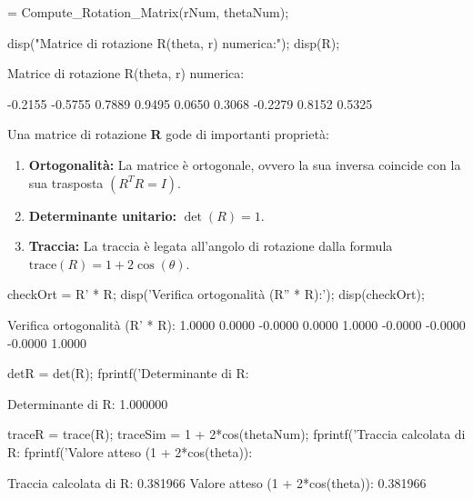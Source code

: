 \documentclass[11pt, a4paper]{article}
\begin{document}
\newpage
\begin{matlabcode}
[R] = Compute_Rotation_Matrix(rNum, thetaNum);

disp("Matrice di rotazione R(theta, r) numerica:");
disp(R);
\end{matlabcode}
\begin{matlaboutput}
Matrice di rotazione R(theta, r) numerica:
\end{matlaboutput}
\begin{matlaboutput}
   -0.2155   -0.5755    0.7889
    0.9495    0.0650    0.3068
   -0.2279    0.8152    0.5325
\end{matlaboutput}

\begin{par}
\begin{flushleft}
Una matrice di rotazione \textbf{R} gode di importanti proprietà:
\end{flushleft}
\end{par}

\begin{enumerate}
\setlength{\itemsep}{1ex}
   \item{\begin{flushleft} \textbf{Ortogonalità:} La matrice è ortogonale, ovvero la sua inversa coincide con la sua trasposta $(R^T R=I)$. \end{flushleft}}
   \item{\begin{flushleft} \textbf{Determinante unitario: }$\det (R)=1$. \end{flushleft}}
   \item{\begin{flushleft} \textbf{Traccia: }La traccia è legata all'angolo di rotazione dalla formula $\textrm{trace}(R)=1+2\cos (\theta )$. \end{flushleft}}
\end{enumerate}

\begin{matlabcode}
checkOrt = R' * R;
disp('Verifica ortogonalità (R'' * R):');
disp(checkOrt);
\end{matlabcode}
\begin{matlaboutput}
Verifica ortogonalità (R' * R):
    1.0000    0.0000   -0.0000
    0.0000    1.0000   -0.0000
   -0.0000   -0.0000    1.0000
\end{matlaboutput}
\begin{matlabcode}
detR = det(R);
fprintf('Determinante di R: %
\end{matlabcode}
\begin{matlaboutput}
Determinante di R: 1.000000
\end{matlaboutput}
\begin{matlabcode}
traceR = trace(R);
traceSim = 1 + 2*cos(thetaNum);
fprintf('Traccia calcolata di R: %
fprintf('Valore atteso (1 + 2*cos(theta)): %
\end{matlabcode}
\begin{matlaboutput}
Traccia calcolata di R: 0.381966
Valore atteso (1 + 2*cos(theta)): 0.381966
\end{matlaboutput}
\end{document}
